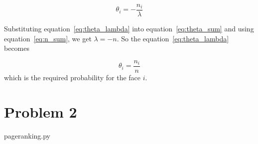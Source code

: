 \documentclass{article}
\begin{document}
\begin{equation}
\label{eq:theta_lambda}
\theta_{i} = -\frac{n_{i}}{\lambda}
\end{equation}

Substituting equation~\ref{eq:theta_lambda} into equation~\ref{eq:theta_sum} and
using equation~\ref{eq:n_sum}, we get $\lambda=-n$. So the equation~\ref{eq:theta_lambda}
becomes

\begin{equation}
\theta_{i} = \frac{n_{i}}{n}
\end{equation}
which is the required probability for the face $i$.

\section{Problem 2}

\begin{lstinputlisting}[language=python]{pageranking.py}
\end{lstinputlisting}
\end{document}
